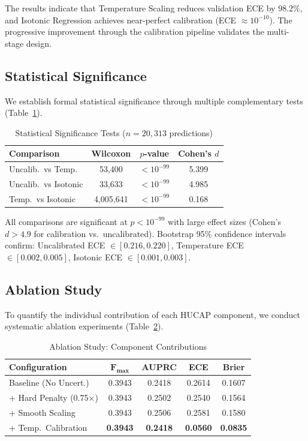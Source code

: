 \documentclass[conference]{IEEEtran}
\begin{document}
The results indicate that Temperature Scaling reduces validation ECE by 98.2\%, and Isotonic Regression achieves near-perfect calibration (ECE $\approx 10^{-10}$). The progressive improvement through the calibration pipeline validates the multi-stage design.

\subsection{Statistical Significance}

We establish formal statistical significance through multiple complementary tests (Table~\ref{tab:stats}).

\begin{table}[t]
\centering
\caption{Statistical Significance Tests ($n = 20{,}313$ predictions)}
\label{tab:stats}
\begin{tabular}{@{}lccc@{}}
\toprule
\textbf{Comparison} & \textbf{Wilcoxon} & \textbf{$p$-value} & \textbf{Cohen's $d$} \\
\midrule
Uncalib.\ vs Temp. & 53{,}400 & $<10^{-99}$ & 5.399 \\
Uncalib.\ vs Isotonic & 33{,}633 & $<10^{-99}$ & 4.985 \\
Temp.\ vs Isotonic & 4{,}005{,}641 & $<10^{-99}$ & 0.168 \\
\bottomrule
\end{tabular}
\end{table}

All comparisons are significant at $p < 10^{-99}$ with large effect sizes (Cohen's $d > 4.9$ for calibration vs.\ uncalibrated). Bootstrap 95\% confidence intervals confirm: Uncalibrated ECE $\in [0.216, 0.220]$, Temperature ECE $\in [0.002, 0.005]$, Isotonic ECE $\in [0.001, 0.003]$.

\subsection{Ablation Study}

To quantify the individual contribution of each HUCAP component, we conduct systematic ablation experiments (Table~\ref{tab:ablation}).

\begin{table}[t]
\centering
\caption{Ablation Study: Component Contributions}
\label{tab:ablation}
\begin{tabular}{@{}lcccc@{}}
\toprule
\textbf{Configuration} & $\mathbf{F_{\max}}$ & \textbf{AUPRC} & \textbf{ECE} & \textbf{Brier} \\
\midrule
Baseline (No Uncert.) & 0.3943 & 0.2418 & 0.2614 & 0.1607 \\
+ Hard Penalty (0.75$\times$) & 0.3943 & 0.2502 & 0.2540 & 0.1564 \\
+ Smooth Scaling & 0.3943 & 0.2506 & 0.2581 & 0.1580 \\
+ Temp.\ Calibration & \textbf{0.3943} & \textbf{0.2418} & \textbf{0.0560} & \textbf{0.0835} \\
\bottomrule
\end{tabular}
\end{table}
\end{document}

